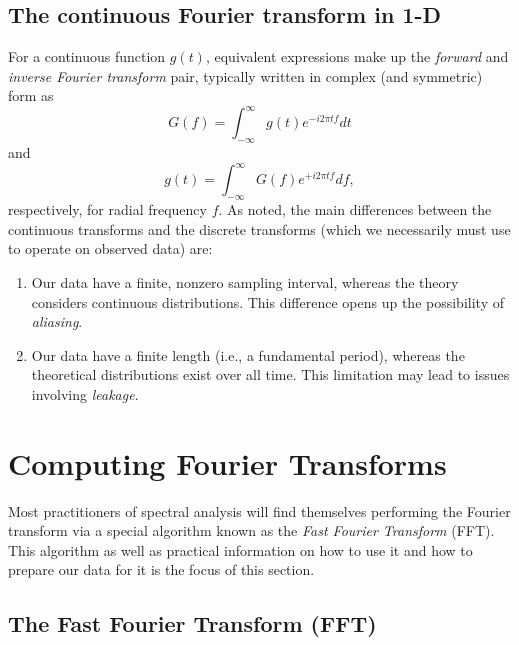 \subsection{The continuous Fourier transform in 1-D}

For a continuous function $g(t)$,  equivalent expressions make up the \emph{forward} and \emph{inverse Fourier transform} pair,
typically written in complex (and symmetric) form as
\begin{equation}
G(f) = \int ^\infty _{-\infty} g(t) e^{-i 2 \pi t f} dt
\label{eq:FT1D}
\end{equation}
and
\begin{equation}
g(t) = \int ^\infty _{-\infty} G(f) e^{+i 2 \pi t f} df,
\label{eq:IFT1D}
\end{equation}
respectively, for radial frequency $f$.  As noted, the main differences between the continuous transforms and the discrete transforms
(which we necessarily must use to operate on observed data) are:
\begin{enumerate}
	\item Our data have a finite, nonzero sampling interval, whereas the theory considers continuous distributions.
	This difference opens up the possibility of \emph{aliasing}.
	\item Our data have a finite length (i.e., a fundamental period), whereas the theoretical distributions exist over all time.
	This limitation may lead to issues involving \emph{leakage}.
\end{enumerate}

\section{Computing Fourier Transforms}
Most practitioners of spectral analysis will find themselves performing the Fourier transform via a special
algorithm known as the \emph{Fast Fourier Transform} (FFT).  This algorithm as well as practical information on how
to use it and how to prepare our data for it is the focus of this section.

\subsection{The Fast Fourier Transform (FFT)}

